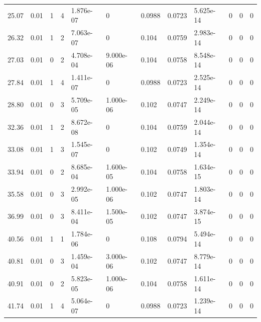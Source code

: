 \documentclass[preview]{standalone}
\begin{document}
{{\begin{tabular}{L{1.2cm}C{1.2cm} C{0.3cm}C{0.5cm} C{1.4cm}C{1.4cm} C{1.4cm}C{1.4cm} C{1.6cm}C{1.6cm} C{1.6cm}C{1.6cm}}
  25.07  &  0.01  & 1     &  4 &  1.876e-07  & 0  &  0.0988&   0.0723& 5.625e-14 & 0   &  0 & 0  \\ 
  26.32  &  0.01  & 1     &  2 &  7.063e-07  & 0  &  0.104&   0.0759& 2.983e-14 & 0   &  0 & 0  \\ 
  27.03  &  0.01  & 0     &  2 &  4.708e-04  & 9.000e-06  &  0.104&   0.0758& 8.548e-14 & 0   &  0 & 0  \\ 
  27.84  &  0.01  & 1     &  4 &  1.411e-07  & 0  &  0.0988&   0.0723& 2.525e-14 & 0   &  0 & 0  \\ 
  28.80  &  0.01  & 0     &  3 &  5.709e-05  & 1.000e-06  &  0.102&   0.0747& 2.249e-14 & 0   &  0 & 0  \\ 
  32.36  &  0.01  & 1     &  2 &  8.672e-08  & 0  &  0.104&   0.0759& 2.044e-14 & 0   &  0 & 0  \\ 
  33.08  &  0.01  & 1     &  3 &  1.545e-07  & 0  &  0.102&   0.0749& 1.354e-14 & 0   &  0 & 0  \\ 
  33.94  &  0.01  & 0     &  2 &  8.685e-04  & 1.600e-05  &  0.104&   0.0758& 1.634e-15 & 0   &  0 & 0  \\ 
  35.58  &  0.01  & 0     &  3 &  2.992e-05  & 1.000e-06  &  0.102&   0.0747& 1.803e-14 & 0   &  0 & 0  \\ 
  36.99  &  0.01  & 0     &  3 &  8.411e-04  & 1.500e-05  &  0.102&   0.0747& 3.874e-15 & 0   &  0 & 0  \\ 
  40.56  &  0.01  & 1     &  1 &  1.784e-06  & 0  &  0.108&   0.0794& 5.494e-14 & 0   &  0 & 0  \\ 
  40.81  &  0.01  & 0     &  3 &  1.459e-04  & 3.000e-06  &  0.102&   0.0747& 8.779e-14 & 0   &  0 & 0  \\ 
  40.91  &  0.01  & 0     &  2 &  5.823e-05  & 1.000e-06  &  0.104&   0.0758& 1.611e-14 & 0   &  0 & 0  \\ 
  41.74  &  0.01  & 1     &  4 &  5.064e-07  & 0  &  0.0988&   0.0723& 1.239e-14 & 0   &  0 & 0  \\ 
\hline 
\end{tabular} 

}}
\end{document}

